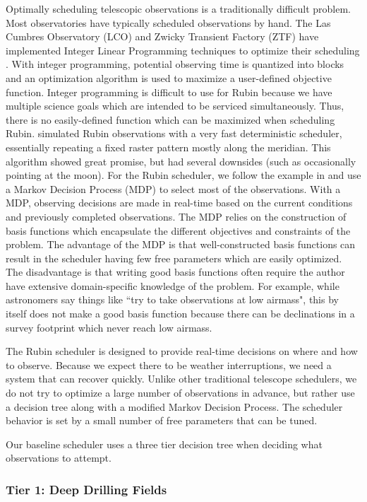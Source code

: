 Optimally scheduling telescopic observations is a traditionally difficult problem. Most observatories have typically scheduled observations by hand. The  Las Cumbres Observatory (LCO) and Zwicky Transient Factory (ZTF) have implemented Integer Linear Programming techniques to optimize their scheduling \citep{Lampoudi15, Bellm19}. With integer programming, potential observing time is quantized into blocks and an optimization algorithm is used to maximize a user-defined objective function.  Integer programming is difficult to use for Rubin because we have multiple science goals which are intended to be serviced simultaneously. Thus, there is no easily-defined function which can be maximized when scheduling Rubin. \citet{Rothchild19} simulated Rubin observations with a very fast deterministic scheduler, essentially repeating a fixed raster pattern mostly along the meridian. This algorithm showed great promise, but had several downsides (such as occasionally pointing at the moon). For the Rubin scheduler, we follow the example in \citet{Naghib19} and use a Markov Decision Process (MDP) to select most of the observations. With a MDP, observing decisions are made in real-time based on the current conditions and previously completed observations. The MDP relies on the construction of basis functions which encapsulate the different objectives and constraints of the problem.  The advantage of the MDP is that well-constructed basis functions can result in the scheduler having few free parameters which are easily optimized. The disadvantage is that writing good basis functions often require the author have extensive domain-specific knowledge of the problem.  For example, while astronomers say things like ``try to take observations at low airmass", this by itself does not make a good basis function because there can be declinations in a survey footprint which never reach low airmass. 

The Rubin scheduler is designed to provide real-time decisions on where and how to observe. Because we expect there to be weather interruptions, we need a system that can recover quickly. Unlike other traditional telescope schedulers, we do not try to optimize a large number of observations in advance, but rather use a decision tree along with a modified Markov Decision Process. The scheduler behavior is set by a small number of free parameters that can be tuned.

Our baseline scheduler uses a three tier decision tree when deciding what observations to attempt. 

\subsubsection{Tier 1:  Deep Drilling Fields}

